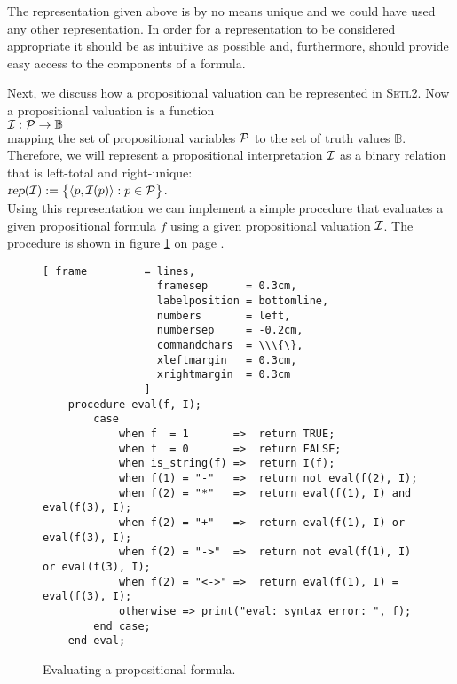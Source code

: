 The representation given above is by no means unique and we could have used any other 
representation. In order for a representation to be considered appropriate
it should be as intuitive as possible and, furthermore, should provide easy access to the components
of a formula.

Next, we discuss how a propositional valuation can be represented in \textsc{Setl2}.
Now a propositional valuation is a function  \\[0.2cm]
\hspace*{1.3cm} ${\cal I}: {\cal P} \rightarrow \mathbb{B}$ \\[0.2cm]
mapping the set of propositional variables  ${\cal P}$ to the set of truth values $\mathbb{B}$.  
Therefore, we will represent a propositional interpretation ${\cal I}$ as a binary
relation that is left-total and right-unique:
\\[0.2cm]
\hspace*{1.3cm}
$\textsl{rep}(\mathcal{I}) := \bigl\{ \langle p, \mathcal{I}(p)\rangle: p \in \mathcal{P} \bigl\}$.
\\[0.2cm]
Using this representation we can implement a simple procedure that evaluates
a given propositional formula $f$ using a given propositional valuation ${\cal I}$.  The
procedure is shown in  figure \ref{fig:eval} on page \pageref{fig:eval}.

\begin{figure}[!ht]
  \centering
\begin{Verbatim}[ frame         = lines, 
                  framesep      = 0.3cm, 
                  labelposition = bottomline,
                  numbers       = left,
                  numbersep     = -0.2cm,
                  commandchars  = \\\{\},
                  xleftmargin   = 0.3cm,
                  xrightmargin  = 0.3cm
                ]
    procedure eval(f, I);
        case
            when f  = 1       =>  return TRUE;
            when f  = 0       =>  return FALSE;
            when is_string(f) =>  return I(f);
            when f(1) = "-"   =>  return not eval(f(2), I);
            when f(2) = "*"   =>  return eval(f(1), I) and  eval(f(3), I);
            when f(2) = "+"   =>  return eval(f(1), I) or   eval(f(3), I);
            when f(2) = "->"  =>  return not eval(f(1), I) or eval(f(3), I);
            when f(2) = "<->" =>  return eval(f(1), I) = eval(f(3), I);
            otherwise => print("eval: syntax error: ", f);
        end case;
    end eval;
\end{Verbatim}
\vspace*{-0.3cm}
  \caption{Evaluating a propositional formula.}
  \label{fig:eval}
\end{figure} 

